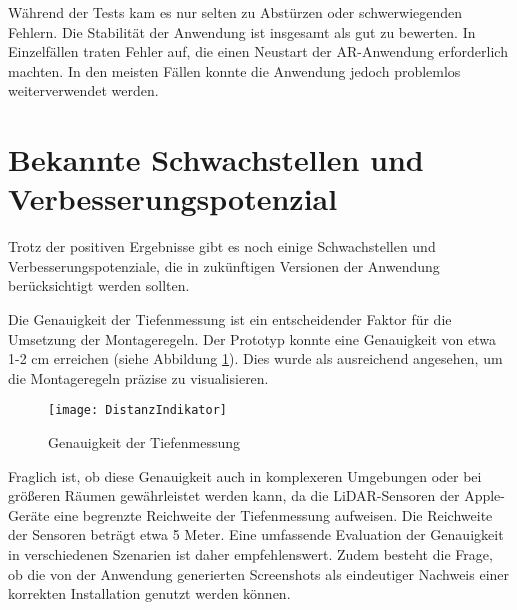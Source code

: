 Während der Tests kam es nur selten zu Abstürzen oder schwerwiegenden Fehlern. Die Stabilität der Anwendung ist insgesamt als gut zu bewerten. In Einzelfällen traten Fehler auf, die einen Neustart der AR-Anwendung erforderlich machten. In den meisten Fällen konnte die Anwendung jedoch problemlos weiterverwendet werden.

\section{Bekannte Schwachstellen und Verbesserungspotenzial}

Trotz der positiven Ergebnisse gibt es noch einige Schwachstellen und Verbesserungspotenziale, die in zukünftigen Versionen der Anwendung berücksichtigt werden sollten.

Die Genauigkeit der Tiefenmessung ist ein entscheidender Faktor für die Umsetzung der Montageregeln. Der Prototyp konnte eine Genauigkeit von etwa 1-2 cm erreichen (siehe Abbildung \ref{fig:DistanceIndicator}). Dies wurde als ausreichend angesehen, um die Montageregeln präzise zu visualisieren. 

\begin{figure}[ht]
    \centering
    \texttt{[image: DistanzIndikator]}
    \caption{Genauigkeit der Tiefenmessung}
    \label{fig:DistanceIndicator}
\end{figure}

Fraglich ist, ob diese Genauigkeit auch in komplexeren Umgebungen oder bei größeren Räumen gewährleistet werden kann, da die LiDAR-Sensoren der Apple-Geräte eine begrenzte Reichweite der Tiefenmessung aufweisen. Die Reichweite der Sensoren beträgt etwa 5 Meter. Eine umfassende Evaluation der Genauigkeit in verschiedenen Szenarien ist daher empfehlenswert. Zudem besteht die Frage, ob die von der Anwendung generierten Screenshots als eindeutiger Nachweis einer korrekten Installation genutzt werden können. \cite{appledevdoc}